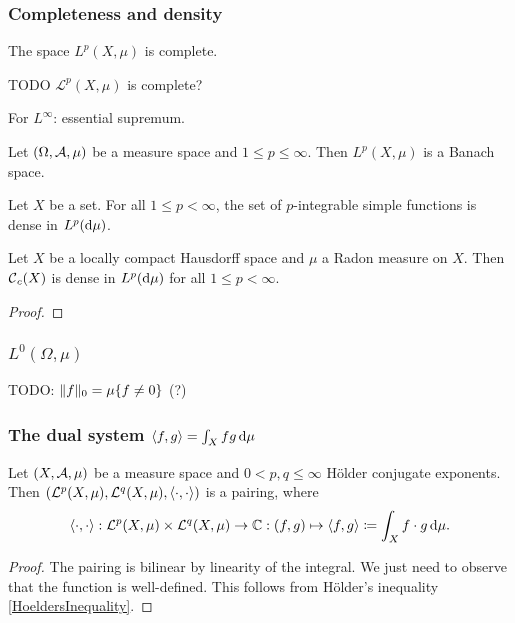 \subsubsection{Completeness and density}

\begin{theorem}
The space $L^p(X,\mu)$ is complete.
\end{theorem}
TODO $\mathcal{L}^p(X,\mu)$ is complete?

For $L^\infty$: essential supremum.

\begin{proposition}
Let $\sSet{\Omega, \mathcal{A}, \mu}$ be a measure space and $1\leq p \leq \infty$. Then $L^p(X,\mu)$ is a Banach space.
\end{proposition}

\begin{proposition}
Let $X$ be a set. For all $1\leq p < \infty$, the set of $p$-integrable simple functions is dense in $L^p(\operatorname{d \!}{\mu})$.
\end{proposition}


\begin{proposition}
Let $X$ be a locally compact Hausdorff space and $\mu$ a Radon measure on $X$. Then $\operatorname{\mathcal{C}}_c(X)$ is dense in $L^p(\operatorname{d \!}{\mu})$ for all $1\leq p < \infty$.
\end{proposition}
\begin{proof}

\end{proof}





\subsubsection{$L^0(\Omega, \mu)$}
TODO: $\lVert f\rVert_0 = \mu\{f\neq 0\}$ (?)


\subsubsection{The dual system $\left\langle f,g \right\rangle = \int_X fg \operatorname{d \!}\mu$}

\begin{lemma}
Let $\sSet{X, \mathcal{A}, \mu}$ be a measure space and $0<p,q\leq \infty$ Hölder conjugate exponents. Then $\sSet{\mathcal{L}^p(X,\mu), \mathcal{L}^q(X,\mu), \pair{\cdot, \cdot}}$ is a pairing, where
\[ \left\langle \cdot, \cdot \right\rangle: \mathcal{L}^p(X,\mu)\times \mathcal{L}^q(X,\mu) \to \mathbb{C}: (f,g) \mapsto \left\langle f,g \right\rangle \coloneqq \int_X f\cdot g \operatorname{d \!}\mu. \]
\end{lemma}
\begin{proof}
The pairing is bilinear by linearity of the integral. We just need to observe that the function is well-defined. This follows from Hölder's inequality \ref{HoeldersInequality}.
\end{proof}

